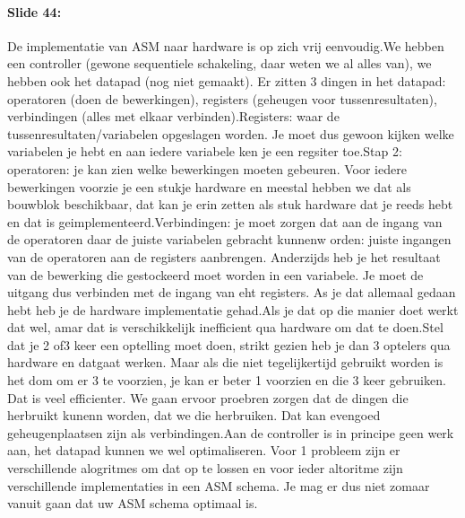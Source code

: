 \documentclass[10pt,a4paper]{book}
\begin{document}
\paragraph{Slide 44:} De implementatie van ASM naar hardware is op zich vrij eenvoudig.We hebben een controller (gewone sequentiele schakeling, daar weten we al alles van), we hebben ook het datapad (nog niet gemaakt). Er zitten 3 dingen in het datapad: operatoren (doen de bewerkingen), registers (geheugen voor tussenresultaten), verbindingen (alles met elkaar verbinden).Registers: waar de tussenresultaten/variabelen opgeslagen worden. Je moet dus gewoon kijken welke variabelen je hebt en aan iedere variabele ken je een regsiter toe.Stap 2: operatoren: je kan zien welke bewerkingen moeten gebeuren. Voor iedere bewerkingen voorzie je een stukje hardware en meestal hebben we dat als bouwblok beschikbaar, dat kan je erin zetten als stuk hardware dat je reeds hebt en dat is geimplementeerd.Verbindingen: je moet zorgen dat aan de ingang van de operatoren daar de juiste variabelen gebracht kunnenw orden: juiste ingangen van de operatoren aan de registers aanbrengen. Anderzijds heb je het resultaat van de bewerking die gestockeerd moet worden in een variabele. Je moet de uitgang dus verbinden met de ingang van eht registers. As je dat allemaal gedaan hebt heb je de hardware implementatie gehad.Als je dat op die manier doet werkt dat wel, amar dat is verschikkelijk inefficient qua hardware om dat te doen.Stel dat je 2 of3 keer een optelling moet doen, strikt gezien heb je dan 3 optelers qua hardware en datgaat werken. Maar als die niet tegelijkertijd gebruikt worden is het dom om er 3 te voorzien, je kan er beter 1 voorzien en die 3 keer gebruiken. Dat is veel efficienter. We gaan ervoor proebren zorgen dat de dingen die herbruikt kunenn worden, dat we die herbruiken. Dat kan evengoed geheugenplaatsen zijn als verbindingen.Aan de controller is in principe geen werk aan, het datapad kunnen we wel optimaliseren. Voor 1 probleem zijn er verschillende alogritmes om dat op te lossen en voor ieder altoritme zijn verschillende implementaties in een ASM schema. Je mag er dus niet zomaar vanuit gaan dat uw ASM schema optimaal is.
\end{document}
